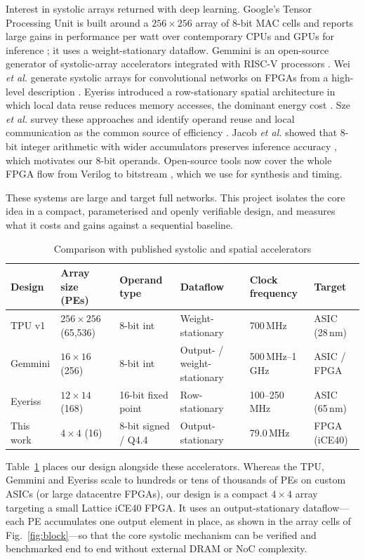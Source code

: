 \documentclass[conference]{IEEEtran}
\begin{document}
Interest in systolic arrays returned with deep learning. Google's Tensor
Processing Unit is built around a $256 \times 256$ array of 8-bit MAC cells and
reports large gains in performance per watt over contemporary CPUs and GPUs for
inference \cite{tpu}; it uses a weight-stationary dataflow. Gemmini is an
open-source generator of systolic-array accelerators integrated with RISC-V
processors \cite{gemmini}. Wei \emph{et al.} generate systolic arrays for
convolutional networks on FPGAs from a high-level description \cite{wei}.
Eyeriss introduced a row-stationary spatial architecture in which local data
reuse reduces memory accesses, the dominant energy cost \cite{eyeriss}. Sze
\emph{et al.} survey these approaches and identify operand reuse and local
communication as the common source of efficiency \cite{sze}. Jacob
\emph{et al.} showed that 8-bit integer arithmetic with wider accumulators
preserves inference accuracy \cite{jacob}, which motivates our 8-bit operands.
Open-source tools now cover the whole FPGA flow from Verilog to bitstream
\cite{yosys,nextpnr}, which we use for synthesis and timing.

These systems are large and target full networks. This project isolates the
core idea in a compact, parameterised and openly verifiable design, and
measures what it costs and gains against a sequential baseline.

\begin{table}[t]
\caption{Comparison with published systolic and spatial accelerators}
\label{tab:litcomp}
\centering
\begin{tabular}{@{}llllll@{}}
\toprule
Design & Array size (PEs) & Operand type & Dataflow & Clock frequency & Target \\
\midrule
TPU v1 \cite{tpu} & $256\times256$ (65,536) & 8-bit int & Weight-stationary & 700\,MHz & ASIC (28\,nm) \\
Gemmini \cite{gemmini} & $16\times16$ (256) & 8-bit int & Output- / weight-stationary & 500\,MHz--1\,GHz & ASIC / FPGA \\
Eyeriss \cite{eyeriss} & $12\times14$ (168) & 16-bit fixed point & Row-stationary & 100--250\,MHz & ASIC (65\,nm) \\
This work & $4\times4$ (16) & 8-bit signed / Q4.4 & Output-stationary & 79.0\,MHz & FPGA (iCE40) \\
\bottomrule
\end{tabular}
\end{table}

Table~\ref{tab:litcomp} places our design alongside these accelerators. Whereas
the TPU, Gemmini and Eyeriss scale to hundreds or tens of thousands of PEs on
custom ASICs (or large datacentre FPGAs), our design is a compact $4\times4$
array targeting a small Lattice iCE40 FPGA. It uses an output-stationary
dataflow---each PE accumulates one output element in place, as shown in the
array cells of Fig.~\ref{fig:block}---so that the core systolic mechanism can
be verified and benchmarked end to end without external DRAM or NoC complexity.
\end{document}
